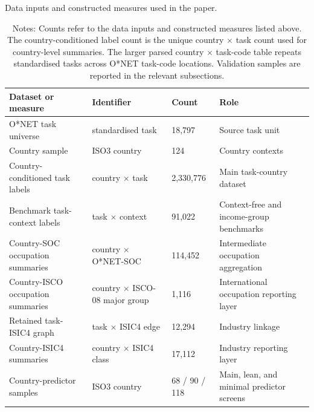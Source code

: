 \begin{table}[H]
\centering
\footnotesize
\caption{Data inputs and constructed measures used in the paper.}
\label{tab:data_inventory}
\begin{tabular}{@{}L{0.29\textwidth}L{0.25\textwidth}C{0.11\textwidth}L{0.25\textwidth}@{}}
\toprule
Dataset or measure & Identifier & Count & Role \\
\midrule
O*NET task universe & standardised task & 18,797 & Source task unit \\
Country sample & ISO3 country & 124 & Country contexts \\
Country-conditioned task labels & country $\times$ task & 2,330,776 & Main task-country dataset \\
Benchmark task-context labels & task $\times$ context & 91,022 & Context-free and income-group benchmarks \\
Country-SOC occupation summaries & country $\times$ O*NET-SOC & 114,452 & Intermediate occupation aggregation \\
Country-ISCO occupation summaries & country $\times$ ISCO-08 major group & 1,116 & International occupation reporting layer \\
Retained task-ISIC4 graph & task $\times$ ISIC4 edge & 12,294 & Industry linkage \\
Country-ISIC4 summaries & country $\times$ ISIC4 class & 17,112 & Industry reporting layer \\
Country-predictor samples & ISO3 country & 68 / 90 / 118 & Main, lean, and minimal predictor screens \\
\bottomrule
\end{tabular}
\caption*{\scriptsize Notes: Counts refer to the data inputs and constructed measures listed above. The country-conditioned label count is the unique country $\times$ task count used for country-level summaries. The larger parsed country $\times$ task-code table repeats standardised tasks across O*NET task-code locations. Validation samples are reported in the relevant subsections.}
\end{table}
